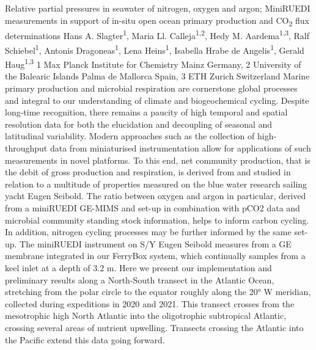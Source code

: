 \begin{conf-abstract}
{Relative partial pressures in seawater of nitrogen, oxygen and argon; MiniRUEDI measurements in support of in-situ open ocean primary production and CO\textsubscript{2} flux determinations}
{Hans A. Slagter\textsuperscript{1}, Maria Ll. Calleja\textsuperscript{1,2}, Hedy M. Aardema\textsuperscript{1,3}, Ralf Schiebel\textsuperscript{1}, Antonis Dragoneas\textsuperscript{1}, Lena Heins\textsuperscript{1}, Isabella Hrabe de Angelis\textsuperscript{1}, Gerald Haug\textsuperscript{1,3}}
{1 Max Planck Institute for Chemistry Mainz Germany, 2 University of the Balearic Islands Palma de Mallorca Spain, 3
ETH Zurich Switzerland}
{Marine primary production and microbial respiration are cornerstone global processes and integral to our understanding of climate and biogeochemical cycling. Despite long-time recognition, there remains a paucity of high temporal and spatial resolution data for both the elucidation and decoupling of seasonal and latitudinal variability. Modern approaches such as the collection of high-throughput data from miniaturised instrumentation allow for applications of such measurements in novel platforms. To this end, net community production, that is the debit of gross production and respiration, is derived from and studied in relation to a multitude of properties measured on the blue water research sailing yacht Eugen Seibold. The ratio between oxygen and argon in particular, derived from a miniRUEDI GE-MIMS and set-up in combination with pCO2 data and microbial community standing stock information, helps to inform carbon cycling. In addition, nitrogen cycling processes may be further informed by the same set-up. The miniRUEDI instrument on S/Y Eugen Seibold measures from a GE membrane integrated in our FerryBox system, which continually samples from a keel inlet at a depth of 3.2 m. Here we present our implementation and preliminary results along a North-South transect in the Atlantic Ocean, stretching from the polar circle to the equator roughly along the 20° W meridian, collected during expeditions in 2020 and 2021. This transect crosses from the mesotrophic high North Atlantic into the oligotrophic subtropical Atlantic, crossing several areas of nutrient upwelling. Transects crossing the Atlantic into the Pacific extend this data going forward.
}
\end{conf-abstract}
